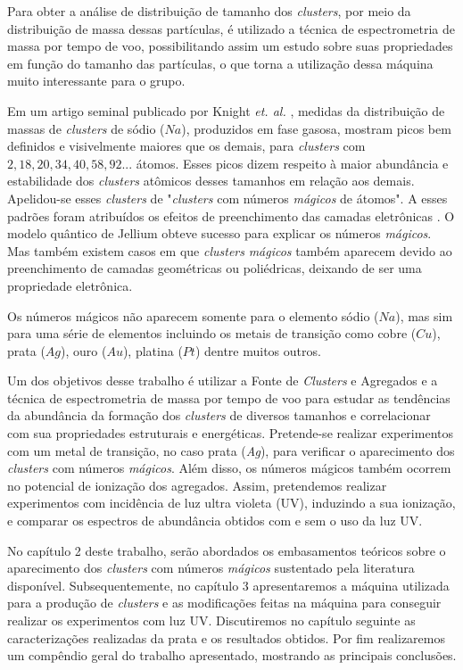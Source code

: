 Para obter a análise de distribuição de tamanho dos \textit{clusters}, por meio da distribuição de massa dessas partículas, é utilizado a técnica de espectrometria de massa por tempo de voo, possibilitando assim um estudo sobre suas propriedades em função do tamanho das partículas, o que torna a utilização dessa máquina muito interessante para o grupo.


Em um artigo seminal publicado por Knight \textit{et. al.} \cite{electronic_Shell_sodium}, medidas da distribuição de massas de \textit{clusters} de sódio ($Na$), produzidos em fase gasosa, mostram picos bem definidos e visivelmente maiores que os demais, para \textit{clusters} com $2, 18, 20, 34, 40, 58,92 ...$ átomos. Esses picos dizem respeito à maior abundância e estabilidade dos \textit{clusters} atômicos desses tamanhos em relação aos demais. Apelidou-se esses \textit{clusters} de "\textit{clusters} com números
\textit{mágicos} de átomos". A esses padrões foram atribuídos os efeitos de preenchimento das camadas eletrônicas \cite{Brack}. O modelo quântico de Jellium \cite{jellium} obteve sucesso para explicar os números \textit{mágicos}. Mas também existem casos em que \textit{clusters} \textit{mágicos} também aparecem devido ao preenchimento de camadas geométricas ou poliédricas, deixando de ser uma propriedade eletrônica.


Os números mágicos não aparecem somente para o elemento sódio ($Na$), mas sim para uma série de elementos incluindo os metais de transição como \cite{magic_1B}  cobre ($Cu$), prata ($Ag$), ouro ($Au$), platina ($Pt$) dentre muitos outros.

Um dos objetivos desse trabalho é utilizar a Fonte de \textit{Clusters} e Agregados e a técnica de espectrometria de massa por tempo de voo para estudar as tendências da abundância da formação dos \textit{clusters} de diversos tamanhos e correlacionar com sua propriedades estruturais e energéticas. Pretende-se realizar experimentos com um metal de transição, no caso prata (\textit{Ag}), para verificar o aparecimento dos \textit{clusters} com números \textit{mágicos}. Além disso, os números mágicos também ocorrem no potencial de ionização dos agregados. Assim, pretendemos realizar experimentos com incidência de luz ultra violeta (UV), induzindo a sua ionização, e comparar os espectros de abundância obtidos com e sem o uso da luz UV. 

No capítulo 2 deste trabalho, serão  abordados os embasamentos teóricos sobre o aparecimento dos \textit{clusters} com números \textit{mágicos} sustentado pela literatura disponível. Subsequentemente, no capítulo 3 apresentaremos a máquina utilizada para a produção de \textit{clusters} e as modificações feitas na máquina para conseguir realizar os experimentos com luz UV. Discutiremos no capítulo seguinte as caracterizações
realizadas da prata e os resultados obtidos. Por fim realizaremos um
compêndio geral do trabalho apresentado, mostrando as principais conclusões. 



 